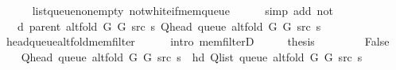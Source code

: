 \begin{isabellebody}
\ \ \ \ \isamarkupfalse%
\ list{\isacharunderscore}{\kern0pt}queue{\isacharunderscore}{\kern0pt}non{\isacharunderscore}{\kern0pt}empty\ not{\isacharunderscore}{\kern0pt}white{\isacharunderscore}{\kern0pt}if{\isacharunderscore}{\kern0pt}mem{\isacharunderscore}{\kern0pt}queue\isanewline
\ \ \ \ \isamarkupfalse%
\ {\isacharparenleft}{\kern0pt}simp\ add{\isacharcolon}{\kern0pt}\ not{\isacharunderscore}{\kern0pt}{\isacharparenleft}{\kern0pt}{}{\isacharparenright}{\kern0pt}{\isacharparenright}{\kern0pt}\isanewline
\ \ \isamarkupfalse%
\ \isamarkupfalse%
\ {\isachardoublequoteopen}{\isachardot}{\kern0pt}{\isachardot}{\kern0pt}{\isachardot}{\kern0pt}\ {\isasymle}\ d\ {\isacharparenleft}{\kern0pt}parent\ {\isacharparenleft}{\kern0pt}alt{\isacharunderscore}{\kern0pt}fold\ G{}\ G{}\ src\ s{\isacharparenright}{\kern0pt}{\isacharparenright}{\kern0pt}\ {\isacharparenleft}{\kern0pt}Q{\isacharunderscore}{\kern0pt}head\ {\isacharparenleft}{\kern0pt}queue\ {\isacharparenleft}{\kern0pt}alt{\isacharunderscore}{\kern0pt}fold\ G{}\ G{}\ src\ s{\isacharparenright}{\kern0pt}{\isacharparenright}{\kern0pt}{\isacharparenright}{\kern0pt}{\isachardoublequoteclose}\isanewline
\ \ \ \ \isamarkupfalse%
\ head{\isacharunderscore}{\kern0pt}queue{\isacharunderscore}{\kern0pt}alt{\isacharunderscore}{\kern0pt}fold{\isacharunderscore}{\kern0pt}mem{\isacharunderscore}{\kern0pt}filter\isanewline
\ \ \ \ \isamarkupfalse%
\ {\isacharparenleft}{\kern0pt}intro\ mem{\isacharunderscore}{\kern0pt}filterD{\isacharparenleft}{\kern0pt}{}{\isacharparenright}{\kern0pt}{\isacharparenright}{\kern0pt}\isanewline
\ \ \isamarkupfalse%
\ \isamarkupfalse%
\ {\isacharquery}{\kern0pt}thesis\isanewline
\ \ \ \ \isacommand{{\isachardot}{\kern0pt}}\isamarkupfalse%
\isanewline
{}\isamarkupfalse%
\isanewline
\ \ \isamarkupfalse%
\ False\isanewline
\ \ \isamarkupfalse%
\ {\isachardoublequoteopen}Q{\isacharunderscore}{\kern0pt}head\ {\isacharparenleft}{\kern0pt}queue\ {\isacharparenleft}{\kern0pt}alt{\isacharunderscore}{\kern0pt}fold\ G{}\ G{}\ src\ s{\isacharparenright}{\kern0pt}{\isacharparenright}{\kern0pt}\ {\isacharequal}{\kern0pt}\ hd\ {\isacharparenleft}{\kern0pt}Q{\isacharunderscore}{\kern0pt}list\ {\isacharparenleft}{\kern0pt}queue\ {\isacharparenleft}{\kern0pt}alt{\isacharunderscore}{\kern0pt}fold\ G{}\ G{}\ src\ s{\isacharparenright}{\kern0pt}{\isacharparenright}{\kern0pt}{\isacharparenright}{\kern0pt}{\isachardoublequoteclose}\isanewline

\end{isabellebody}
